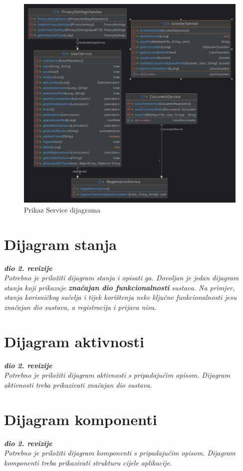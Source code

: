 \begin{figure} [H]

	\includegraphics[width=1\linewidth]{slike/ServiceDiagram.png}
	\centering
	\caption{Prikaz Service dijagrama}
	\label{fig:Prikaz Service dijagrama}
\end{figure}


\section{Dijagram stanja}


\textbf{\textit{dio 2. revizije}}\\

\textit{Potrebno je priložiti dijagram stanja i opisati ga. Dovoljan je jedan dijagram stanja koji prikazuje \textbf{značajan dio funkcionalnosti} sustava. Na primjer, stanja korisničkog sučelja i tijek korištenja neke ključne funkcionalnosti jesu značajan dio sustava, a registracija i prijava nisu. }


\eject

\section{Dijagram aktivnosti}

\textbf{\textit{dio 2. revizije}}\\

\textit{Potrebno je priložiti dijagram aktivnosti s pripadajućim opisom. Dijagram aktivnosti treba prikazivati značajan dio sustava.}

\eject
\section{Dijagram komponenti}

\textbf{\textit{dio 2. revizije}}\\

\textit{Potrebno je priložiti dijagram komponenti s pripadajućim opisom. Dijagram komponenti treba prikazivati strukturu cijele aplikacije.}